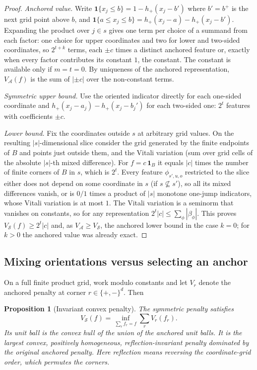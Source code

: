 \documentclass[11pt]{article}
\newtheorem{proposition}{Proposition}
\theoremstyle{definition}
\theoremstyle{remark}
\newcommand{\one}{\mathbf{1}}
\begin{document}
\begin{proof}
\emph{Anchored value.} Write $\one\{x_j \le b\} = 1 - h_+(x_j - b')$ where
$b' = b^+$ is the next grid point above $b$, and
$\one\{a \le x_j \le b\} = h_+(x_j - a) - h_+(x_j - b')$. Expanding the
product over $j \in s$ gives one term per choice of a summand from each
factor: one choice for upper coordinates and two for lower and two-sided
coordinates, so $2^{t+k}$ terms, each $\pm c$ times a distinct anchored
feature or, exactly when every factor contributes its constant $1$, the
constant. The constant is available only if $m = t = 0$. By uniqueness of
the anchored representation, $V_{\mathcal{A}}(f)$ is the sum of
$|{\pm c}|$ over the non-constant terms.

\emph{Symmetric upper bound.} Use the oriented indicator directly for each
one-sided coordinate and $h_+(x_j - a_j) - h_+(x_j - b_j')$ for each
two-sided one: $2^t$ features with coefficients $\pm c$.

\emph{Lower bound.} Fix the coordinates outside $s$ at arbitrary grid values. On the resulting $|s|$-dimensional slice consider the grid
generated by the finite endpoints of $B$ and points just outside them, and
the Vitali variation (sum over grid cells of the absolute $|s|$-th mixed
difference). For $f = c\,\one_B$ it equals $|c|$ times the number of
finite corners of $B$ in $s$, which is $2^t$. Every feature
$\phi_{s',u,o}$ restricted to the slice either does not depend on some
coordinate in $s$ (if $s \not\subseteq s'$), so all its mixed differences
vanish, or is $0/1$ times a product of $|s|$ monotone one-jump indicators,
whose Vitali variation is at most $1$. The Vitali variation is a seminorm
that vanishes on constants, so for any representation
$2^t |c| \le \sum_\phi |\beta_\phi|$. This proves
$V_{\mathcal{S}}(f) \ge 2^t |c|$ and, as $V_{\mathcal{A}} \ge V_{\mathcal{S}}$,
the anchored lower bound in the case $k = 0$; for $k>0$ the anchored value
was already exact.
\end{proof}

\subsection{Mixing orientations versus selecting an anchor}

On a full finite product grid, work modulo constants and let $V_r$ denote
the anchored penalty at corner $r\in\{+,-\}^d$. Then
\begin{proposition}[Invariant convex penalty]\label{prop:convex}
The symmetric penalty satisfies
\[
 V_{\mathcal S}(f)=\inf_{\sum_r f_r=f}\sum_r V_r(f_r).
\]
Its unit ball is the convex hull of the union of the anchored unit balls.
It is the largest convex, positively homogeneous, reflection-invariant
penalty dominated by the original anchored penalty. Here reflection means
reversing the coordinate-grid order, which permutes the corners.
\end{proposition}
\end{document}
